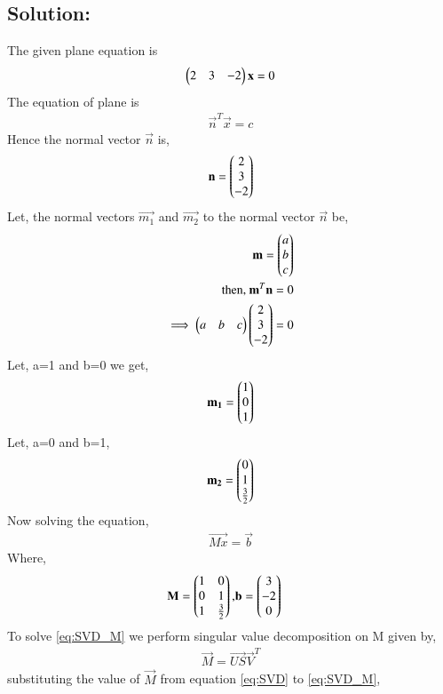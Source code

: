 \documentclass[journal,12pt,twocolumn]{IEEEtran}
\begin{document}
\subsection*{Solution:}
The given plane equation is
\begin{align}
\begin{pmatrix}2&3&-2\end{pmatrix}\mathbf{x} = 0\label{eq:genform}\\
\end{align}
The equation of plane is
\begin{align}
\vec{n}^T\vec{x} = c
\end{align}
Hence the normal vector $\vec{n}$ is,
\begin{align}
\mathbf{n} = \begin{pmatrix}2\\3\\-2\end{pmatrix}
\end{align}
Let, the normal vectors $\vec{m_1}$ and $\vec{m_2}$ to the normal vector $\vec{n}$ be, 
\begin{align}
\mathbf{m} = \begin{pmatrix}a\\b\\c\end{pmatrix}\\
\mbox{then, } \mathbf{m}^T\mathbf{n} = 0\\
\implies \begin{pmatrix}a&b&c\end{pmatrix}\begin{pmatrix}2\\3\\-2\end{pmatrix} = 0
\end{align}  
Let, a=1 and b=0 we get,
\begin{align}
\mathbf{m_1} = \begin{pmatrix}1\\0\\1\end{pmatrix}
\end{align}
Let, a=0 and b=1,
\begin{align}
\mathbf{m_2} = \begin{pmatrix}0\\1\\\frac{3}{2}\end{pmatrix}
\end{align}
Now solving the equation,
\begin{align}
\vec{Mx} = \vec{b}
\label{eq:SVD_M}
\end{align}
Where,
\begin{align}
\mathbf{M} = \begin{pmatrix}1&0\\0&1\\1&\frac{3}{2}\end{pmatrix} , & \mathbf{b} = \begin{pmatrix}3\\-2\\0\end{pmatrix}\label{eq:b}
\end{align}
To solve \eqref{eq:SVD_M} we perform singular value decomposition on M given by, 
\begin{align}
\vec{M} = \vec{US}\vec{V}^T
\label{eq:SVD}
\end{align}
substituting the value of $\vec{M}$ from equation \eqref{eq:SVD} to \eqref{eq:SVD_M},
\end{document}
